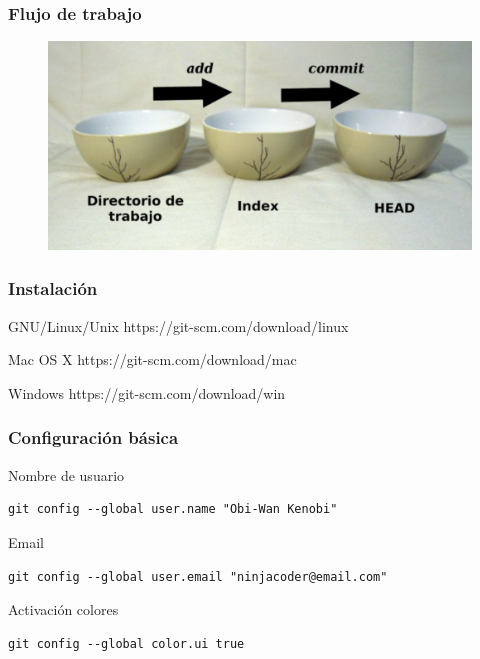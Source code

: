 \documentclass{beamer}
\begin{document}
\begin{frame}
\frametitle{Flujo de trabajo}
\begin{figure}
\includegraphics[width=0.8\linewidth]{img/cuencos.png}
\end{figure}
\end{frame}

\begin{frame}
\frametitle{Instalación}
\begin{block}{GNU/Linux/Unix}
https://git-scm.com/download/linux
\end{block}
\vskip 0.50cm
\begin{block}{Mac OS X}
https://git-scm.com/download/mac
\end{block}
\vskip 0.50cm
\begin{block}{Windows}
https://git-scm.com/download/win
\end{block}
\end{frame}

\begin{frame}[fragile]
\frametitle{Configuración básica}
\begin{block}{Nombre de usuario}
\begin{verbatim}
git config --global user.name "Obi-Wan Kenobi"
\end{verbatim}
\end{block}
\begin{block}{Email}
\begin{verbatim}
git config --global user.email "ninjacoder@email.com"
\end{verbatim}
\end{block}
\begin{block}{Activación colores}
\begin{verbatim}
git config --global color.ui true
\end{verbatim}
\end{block}
\end{frame}
\end{document}
